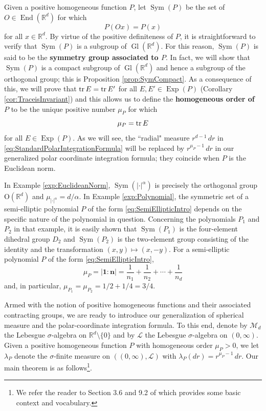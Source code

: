 \documentclass[11pt]{article}
\newenvironment{example}
  {\pushQED{\qed}\renewcommand{\qedsymbol}{$\triangle$}\examplex}
  {\popQED\endexamplex}
\theoremstyle{remark}
\newcommand\End{\operatorname{End}} %
\newcommand\Gl{\operatorname{Gl}} %
\newcommand\OdR{\mbox{O}(\mathbb{R}^d)} %
\newcommand\Sym{\operatorname{Sym}}
\newcommand\Exp{\operatorname{Exp}}
\begin{document}
\noindent Given a positive homogeneous function $P$, let $\Sym(P)$ be the set of $O\in\End(\mathbb{R}^d)$ for which
\begin{equation*}
P(Ox)=P(x)
\end{equation*}
for all $x\in\mathbb{R}^d$. By virtue of the positive definiteness of $P$, it is straightforward to verify that $\Sym(P)$ is a subgroup of $\Gl(\mathbb{R}^d)$. For this reason, $\Sym(P)$ is said to be the \textbf{symmetry group associated to $P$}. In fact, we will show that $\Sym(P)$ is a compact subgroup of $\Gl(\mathbb{R}^d)$ and hence a subgroup of the orthogonal group; this is Proposition \ref{prop:SymCompact}. As a consequence of this, we will prove that $\tr E=\tr E'$ for all $E,E'\in\Exp(P)$ (Corollary \ref{cor:TraceisInvariant}) and this allows us to define the \textbf{homogeneous order of $P$} to be the unique positive number $\mu_P$ for which
\begin{equation*}
\mu_P=\tr E
\end{equation*}
for all $E\in\Exp(P)$. As we will see, the ``radial" measure $r^{d-1}\,dr$ in \eqref{eq:StandardPolarIntegrationFormula} will be replaced by $r^{\mu_P-1}\,dr$ in our generalized polar coordinate integration formula; they coincide when $P$ is the Euclidean norm.

\begin{example}\normalfont
In Example \ref{exp:EuclideanNorm}, $\Sym(|\cdot|^\alpha)$ is precisely the orthogonal group $\OdR$ and $\mu_{|\cdot|^\alpha}=d/\alpha$. In Example \ref{exp:Polynomial}, the symmetric set of a semi-elliptic polynomial $P$ of the form \eqref{eq:SemiEllipticIntro} depends on the specific nature of the polynomial in question. Concerning the polynomials $P_1$ and $P_2$ in that example, it is easily shown that $\Sym(P_1)$ is the four-element dihedral group $D_2$ and $\Sym(P_2)$ is the two-element group consisting of the identity and the transformation $(x,y)\mapsto (x,-y)$. For a semi-elliptic polynomial $P$ of the form \eqref{eq:SemiEllipticIntro}, 
\begin{equation*}
    \mu_P=|\mathbf{1}:\mathbf{n}|=\frac{1}{n_1}+\frac{1}{n_2}+\cdots+\frac{1}{n_d}
\end{equation*}
and, in particular, $\mu_{P_1}=\mu_{P_2}=1/2+1/4=3/4.$
\end{example}

\noindent Armed with the notion of positive homogeneous functions and their associated contracting groups, we are ready to introduce our generalization of spherical measure and the polar-coordinate integration formula. To this end, denote by $\mathcal{M}_d$ the Lebesgue $\sigma$-algebra on $\mathbb{R}^d\setminus\{0\}$ and by $\mathcal{L}$ the Lebesgue $\sigma$-algebra on $(0,\infty)$. Given a positive homogeneous function $P$ with homogeneous order $\mu_P>0$, we let $\lambda_P$ denote the $\sigma$-finite measure on $((0,\infty),\mathcal{L})$ with $\lambda_P(dr)=r^{\mu_P-1}\,dr$. Our main theorem is as follows\footnote{We refer the reader to Section 3.6 and 9.2 of \cite{bogachev_measure_2007} which provides some basic context and vocabulary.}. 
\end{document}
